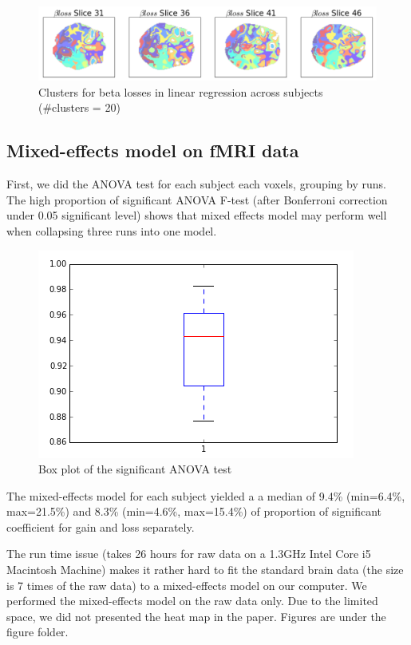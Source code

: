 \documentclass[11pt]{article}
\begin{document}
\begin{figure}[H]
    \centering
        \includegraphics[scale=0.4]{figures/Regression2/beta_loss_cluster.png}
    \caption{Clusters for beta losses in linear regression across subjects (\#clusters = 20)}
\end{figure}


\subsection{Mixed-effects model on fMRI data}
First, we did the ANOVA test for each subject each voxels, grouping by runs. 
The high proportion of significant ANOVA F-test (after Bonferroni correction 
under 0.05 significant level) shows that mixed effects model may perform well 
when collapsing three runs into one model. 
\begin{figure}[H]
    \centering
        \includegraphics[scale=0.45]{figures/anova_prop.png}
\caption{Box plot of the significant ANOVA test}
\end{figure}
The mixed-effects model for each subject yielded a a median of 9.4\% (min=6.4\%, 
max=21.5\%) and 8.3\% (min=4.6\%, max=15.4\%) of proportion of significant 
coefficient for gain and loss separately. 

The run time issue (takes 26 hours for raw data on a 1.3GHz Intel Core i5 Macintosh Machine) makes it rather hard to fit the standard brain data (the size is 7 times of the raw data) to a mixed-effects model on our computer. We performed the mixed-effects model on the raw data only. Due to the limited space, we did not presented the heat map in the paper. Figures are under the figure folder.
\end{document}
